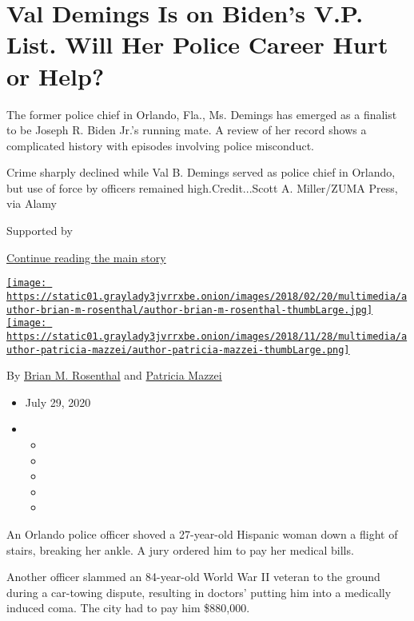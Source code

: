 \hypertarget{val-demings-is-on-bidens-vp-list-will-her-police-career-hurt-or-help}{%
\section{Val Demings Is on Biden's V.P. List. Will Her Police Career
Hurt or
Help?}\label{val-demings-is-on-bidens-vp-list-will-her-police-career-hurt-or-help}}

The former police chief in Orlando, Fla., Ms. Demings has emerged as a
finalist to be Joseph R. Biden Jr.'s running mate. A review of her
record shows a complicated history with episodes involving police
misconduct.

Crime sharply declined while Val B. Demings served as police chief in
Orlando, but use of force by officers remained high.Credit...Scott A.
Miller/ZUMA Press, via Alamy

Supported by

\protect\hyperlink{after-sponsor}{Continue reading the main story}

\href{https://www.nytimes3xbfgragh.onion/by/brian-m-rosenthal}{\texttt{[image: https://static01.graylady3jvrrxbe.onion/images/2018/02/20/multimedia/author-brian-m-rosenthal/author-brian-m-rosenthal-thumbLarge.jpg]}}\href{https://www.nytimes3xbfgragh.onion/by/patricia-mazzei}{\texttt{[image: https://static01.graylady3jvrrxbe.onion/images/2018/11/28/multimedia/author-patricia-mazzei/author-patricia-mazzei-thumbLarge.png]}}

By \href{https://www.nytimes3xbfgragh.onion/by/brian-m-rosenthal}{Brian
M. Rosenthal} and
\href{https://www.nytimes3xbfgragh.onion/by/patricia-mazzei}{Patricia
Mazzei}

\begin{itemize}
\item
  July 29, 2020
\item
  \begin{itemize}
  \item
  \item
  \item
  \item
  \item
  \end{itemize}
\end{itemize}

An Orlando police officer shoved a 27-year-old Hispanic woman down a
flight of stairs, breaking her ankle. A jury ordered him to pay her
medical bills.

Another officer slammed an 84-year-old World War II veteran to the
ground during a car-towing dispute, resulting in doctors' putting him
into a medically induced coma. The city had to pay him \$880,000.

